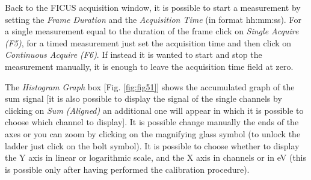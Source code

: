 \documentclass[a4paper,12pt,oneside,pdflatex,italian,final,twocolumn]{article}
\begin{document}
Back to the FICUS acquisition window, it is possible to start a measurement by setting the \textit{Frame Duration} and the \textit{Acquisition Time} (in format hh:mm:ss). For a single measurement equal to the duration of the frame click on \textit{Single Acquire (F5)}, for a timed measurement just set the acquisition time and then click on \textit{Continuous Acquire (F6)}. If instead it is wanted to start and stop the measurement manually, it is enough to leave the acquisition time field at zero.

The \textit{Histogram Graph} box [Fig. \ref{fig:fig51}] shows the accumulated graph of the sum signal [it is also possible to display the signal of the single channels by clicking on \textit{Sum (Aligned)} an additional one will appear in which it is possible to choose which channel to display]. It is possible change manually the ends of the axes or you can zoom by clicking on the magnifying glass symbol (to unlock the ladder just click on the bolt symbol).
It is possible to choose whether to display the Y axis in linear or logarithmic scale, and the X axis in channels or in eV (this is possible only after having performed the calibration procedure).

\clearpage
\end{document}
